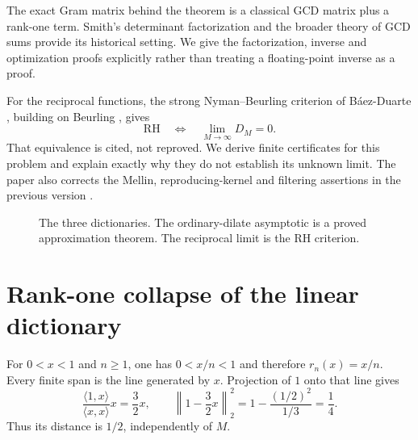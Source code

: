 \documentclass[11pt]{amsart}
\theoremstyle{definition}
\newcommand{\one}{\boldsymbol 1}\newcommand{\diag}{\operatorname{diag}}
\begin{document}
The exact Gram matrix behind the theorem is a classical GCD matrix
plus a rank-one term. Smith's determinant factorization \cite{Smith}
and the broader theory of GCD sums \cite{ABS} provide its historical
setting. We give the factorization, inverse and optimization proofs
explicitly rather than treating a floating-point inverse as a proof.

For the reciprocal functions, the strong Nyman--Beurling criterion of
B\'aez-Duarte \cite{BD}, building on Beurling \cite{Beurling}, gives
\begin{equation}\label{eq:RHcriterion}
 \mathrm{RH}\quad\Longleftrightarrow\quad\lim_{M\to\infty}D_M=0.
\end{equation}
That equivalence is cited, not reproved. We derive finite certificates
for this problem and explain exactly why they do not establish its
unknown limit. The paper also corrects the Mellin, reproducing-kernel
and filtering assertions in the previous version \cite{Previous}.

\begin{figure}[tb]
\centering
{}
\caption{The three dictionaries. The ordinary-dilate asymptotic is a
proved approximation theorem. The reciprocal limit is the RH criterion.}
\end{figure}

\section{Rank-one collapse of the linear dictionary}
For $0<x<1$ and $n\ge1$, one has $0<x/n<1$ and therefore
$r_n(x)=x/n$. Every finite span is the line generated by $x$.
Projection of $1$ onto that line gives
\[
 \frac{\langle1,x\rangle}{\langle x,x\rangle}x=\frac32x,
 \qquad
 \left\|1-\frac32x\right\|_2^2
   =1-\frac{(1/2)^2}{1/3}=\frac14.
\]
Thus its distance is $1/2$, independently of $M$.
\end{document}
